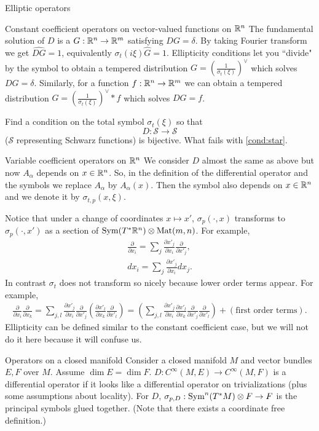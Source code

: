 \begin{clear}{Elliptic operators}
\begin{clear}{Constant coefficient operators on vector-valued functions on $\mathbb{R}^n$}
The fundamental solution of $D$ is a $G:\mathbb{R}^n \to \mathbb{R}^m$ satisfying $DG = \delta$.
By taking Fourier transform we get $\widehat{DG} = 1$, equivalently $\sigma_t(i \xi) \hat{G} = 1$. 
Ellipticity conditions let you ``divide" by the symbol to obtain a tempered distribution 
$G = \left( \frac{1}{\sigma_t(\xi)}\right)^\vee $ which solves $DG = \delta$. Similarly, for a function $f:\mathbb{R}^n \to \mathbb{R}^m$ we can obtain a tempered distribution $G = \left( \frac{1}{\sigma_t(\xi)}\right)^\vee \ast f $ which solves $DG = f$.

\begin{xca}
Find a condition on the total symbol $\sigma_t (\xi)$ so that $$D: \mathcal{S} \to \mathcal{S}$$ ($\mathcal{S}$ representing Schwarz functions) is bijective. What fails with \eqref{cond:star}.
\end{xca}
\end{clear}
\begin{clear}{Variable coefficient operators on $\mathbb{R}^n$}
We consider $D$ almost the same as above but now $A_\alpha$ depends on $x \in \mathbb{R}^n$. So, in the definition of the differential operator and the symbols we replace $A_\alpha$ by $A_\alpha(x)$. Then the symbol also depends on $x \in \mathbb{R}^n$ and we denote it by $\sigma_{t,p}(x, \xi)$.

Notice that under a change of coordinates $x \mapsto x'$, $\sigma_p( \cdot , x)$ transforms to $\sigma_p(\cdot, x')$ as a section of $\Sym(T^* \R^n) \otimes \Mat (m,n)$. For example,
\begin{align*}
\frac{\partial}{\partial x_i} = \sum_j \frac{\partial x'_j}{\partial x_i} \frac{\partial}{\partial x'_j},\\
dx_i = \sum_j  \frac{\partial x'_j}{\partial x_i} dx_j.
\end{align*}
In contrast $\sigma_t$ does not transform so nicely because lower order terms appear. For example,
\begin{align*}
\frac{\partial}{\partial x_i}\frac{\partial}{\partial x_k} = \sum_{j,l} \frac{\partial x'_j}{\partial x_i}\frac{\partial}{\partial x'_j}\left(\frac{\partial x'_l}{\partial x_k} \frac{\partial}{\partial x'_l}\right) = \left( \sum_{j,l} \frac{\partial x'_j}{\partial x_i}\frac{\partial x'_l}{\partial x_k} \frac{\partial}{\partial x'_j} \frac{\partial}{\partial x'_l}\right) + (\mbox{first order terms}).
\end{align*}
Ellipticity can be defined similar to the constant coefficient case, but we will not do it here because it will confuse us.

\begin{clear}{Operators on a closed manifold}
Consider a closed manifold $M$ and vector bundles $E, F$ over $M$. Assume $\dim E = \dim F$. $D: C^\infty (M,E) \to C^\infty (M,F)$ is a differential operator if it looks like a differential operator on trivializations (plus some assumptions about locality). For $D$, $\sigma_{p,D} : \Sym^n (T^* M) \otimes F \to F$ is the principal symbols glued together. (Note that there exists a coordinate free definition.)


\end{clear}
\end{clear}
\end{clear}
